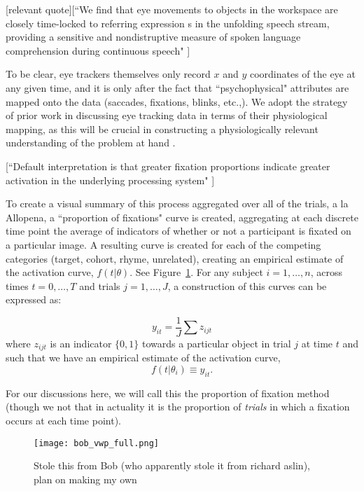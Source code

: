 [relevant quote][``We find that eye movements to objects in the workspace are closely time-locked to referring expression s in the unfolding speech stream, providing a sensitive and nondistruptive measure of spoken language comprehension during continuous speech" \cite{allopenna1998tracking}]

To be clear, eye trackers themselves only record $x$ and $y$ coordinates of the eye at any given time, and it is only after the fact that ``psychophysical" attributes are mapped onto the data (saccades, fixations, blinks, etc.,). We adopt the strategy of prior work in discussing eye tracking data in terms of their physiological mapping, as this will be crucial in constructing a physiologically relevant understanding of the problem at hand \cite{mcmurray2002look}.

[``Default interpretation is that greater fixation proportions indicate greater activation in the underlying processing system" \cite{Magnuson2019}]


To create a visual summary of this process aggregated over all of the trials, a la Allopena, a ``proportion of fixations" curve is created, aggregating at each discrete time point the average of indicators of whether or not a participant is fixated on a particular image. A resulting curve is created for each of the competing categories (target, cohort, rhyme, unrelated), creating an empirical estimate of the activation curve, $f(t|\theta)$. See Figure~\ref{fig:bob_diagram_full}. For any subject $i = 1, \dots, n$, across times $t = 0, \dots, T$ and trials $j = 1, \dots, J$, a construction  of this curves can be expressed as:


\begin{equation}\label{eq:sum_proportions}
y_{it} = \frac1J \sum z_{ijt}
\end{equation}
where $z_{ijt}$ is an indicator $\{0, 1\}$  towards a particular object in trial $j$ at time $t$ and such that we have an empirical estimate of the activation curve,
\begin{equation}\label{eq:empir_to_activation}
f(t | \theta_i) \equiv y_{it}.
\end{equation}



For our discussions here, we will call this the proportion of fixation method (though we not that in actuality it is the proportion of \textit{trials} in which a fixation occurs at each time point).


\begin{figure}[H]
\centering
\texttt{[image: bob\_vwp\_full.png]}
\caption{Stole this from Bob (who apparently stole it from richard aslin), plan on making my own}
\label{fig:bob_diagram_full}
\end{figure}


